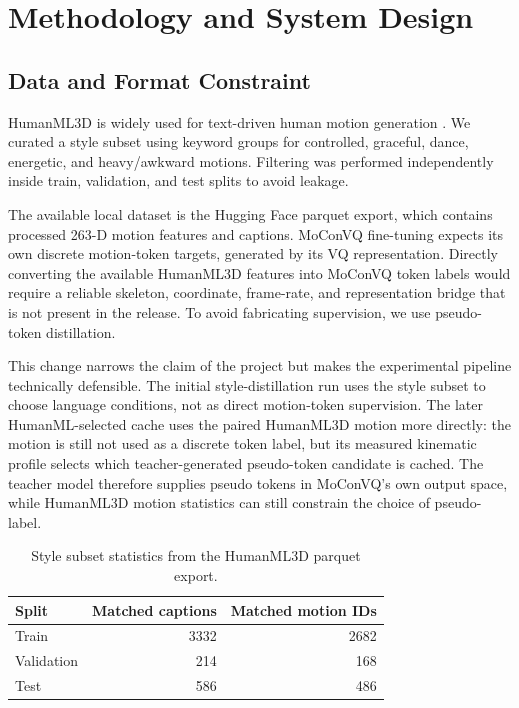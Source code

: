 \documentclass[conference]{IEEEtran}
\begin{document}
\section{Methodology and System Design}
\subsection{Data and Format Constraint}
HumanML3D is widely used for text-driven human motion generation \cite{guo2022humanml3d}. We curated a style subset using keyword groups for controlled, graceful, dance, energetic, and heavy/awkward motions. Filtering was performed independently inside train, validation, and test splits to avoid leakage.

The available local dataset is the Hugging Face parquet export, which contains processed 263-D motion features and captions. MoConVQ fine-tuning expects its own discrete motion-token targets, generated by its VQ representation. Directly converting the available HumanML3D features into MoConVQ token labels would require a reliable skeleton, coordinate, frame-rate, and representation bridge that is not present in the release. To avoid fabricating supervision, we use pseudo-token distillation.

This change narrows the claim of the project but makes the experimental pipeline technically defensible. The initial style-distillation run uses the style subset to choose language conditions, not as direct motion-token supervision. The later HumanML-selected cache uses the paired HumanML3D motion more directly: the motion is still not used as a discrete token label, but its measured kinematic profile selects which teacher-generated pseudo-token candidate is cached. The teacher model therefore supplies pseudo tokens in MoConVQ's own output space, while HumanML3D motion statistics can still constrain the choice of pseudo-label.

\begin{table}[!t]
\centering
\caption{Style subset statistics from the HumanML3D parquet export.}
\footnotesize
\begin{tabular}{lrr}
\hline
Split & Matched captions & Matched motion IDs \\
\hline
Train & 3332 & 2682 \\
Validation & 214 & 168 \\
Test & 586 & 486 \\
\hline
\end{tabular}
\end{table}
\end{document}
